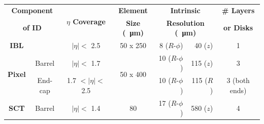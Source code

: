 
{\renewcommand{\arraystretch}{1.2}
\begin{table}[!htb]
\centering
\begin{tabular}{|cc||c|c|rr|c|}
  \hline
  \multicolumn{2}{|c||}{\textbf{Component}} & \multirow{2}{*}{\textbf{$\eta$ Coverage}} & \textbf{Element} &  \multicolumn{2}{c|}{\textbf{Intrinsic}} & \textbf{\# Layers} \\
  \multicolumn{2}{|c||}{\textbf{of ID}}     &       & \textbf{Size (\SI{}{\micro\metre})}  & \multicolumn{2}{c|}{\textbf{Resolution (\SI{}{\micro\metre})}} &  \textbf{or Disks}          \\
  \hline
  \multirow{2}{*}{\textbf{IBL}} & & \multirow{2}{*}{$|\eta| \lt$  2.5}   & \multirow{2}{*}{50 x 250} & \multirow{2}{*}{8 ($R$-$\phi$)}& \multirow{2}{*}{40 ($z$)}  & \multirow{2}{*}{1} \\ %
   &&&&&&\\\hline                                                                                                                                                  
  \multirow{2}{*}{\textbf{Pixel}} & Barrel    &  $|\eta| \lt$  1.7            & \multirow{2}{*}{50 x 400} & 10 ($R$-$\phi$)        & 115 ($z$)          & 3                \\ %
                         & End-cap   &         1.7  $\lt |\eta| \lt$  2.5    &                    & 10 ($R$-$\phi$)        & 115 ($R$)          & 3 (both ends)    \\ %
  \hline                                                                                                                                                
  \multirow{2}{*}{\textbf{SCT}}   & Barrel    & $|\eta| \lt$  1.4             &\multirow{2}{*}{80}       &  17 ($R$-$\phi$)        & 580 ($z$)          & 4                \\ %

\end{tabular}
\end{table}}
